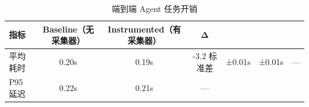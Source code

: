 \documentclass[11pt]{ctexart}
\begin{document}
\thispagestyle{empty}
\begin{table}[H]
\centering
\caption{端到端 Agent 任务开销}
\small
\begin{tabular}{lccc}
\toprule
\textbf{指标} & \textbf{Baseline（无采集器）} & \textbf{Instrumented（有采集器）} & \textbf{Δ} \\
\midrule
平均耗时 & 0.20s & 0.19s & -3.2%
标准差 & ±0.01s & ±0.01s & — \\
P95 延迟 & 0.22s & 0.21s & — \\
\bottomrule
\end{tabular}
\end{table}
\end{document}
